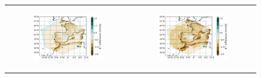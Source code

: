 \begin{figure}[htbp]
\begin{tabular}{cc}
        \begin{subfigure}[b]{0.33\textwidth}
            \caption{}
            \includegraphics[width=\textwidth]{images/chap4/forcing_sampling_freq/diff_map_evap_era_era.png}
        \end{subfigure} &
        \begin{subfigure}[b]{0.33\textwidth}
            \caption{}
            \includegraphics[width=\textwidth]{images/chap4/forcing_sampling_freq/diff_map_evap_ico_era.png}
        \end{subfigure} \\
        

\end{tabular}
\end{figure}
